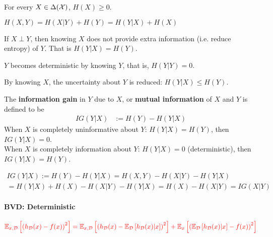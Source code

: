 \documentclass[4pt]{article}
\begin{document}
	\begin{proposition}
		For every $X \in \Delta(\mathcal{{X}})$, $H(X) \geq 0$.
	\end{proposition}
	\begin{proposition}
		$
			H(X, Y)=H(X | Y)+H(Y)=H(Y | X)+H(X)
		$
	\end{proposition}
	\begin{proposition}
		If $X \perp Y$, then knowing $X$ does not provide extra information (i.e. reduce entropy) of $Y$. That is $H(Y|X) = H(Y)$.
	\end{proposition}
	\begin{proposition}
		$Y$ becomes deterministic by knowing $Y$, that is, $H(Y|Y) = 0$.
	\end{proposition}
	\begin{proposition}
		By knowing $X$, the uncertainty about $Y$ is reduced: $H(Y|X) \leq H(Y)$.
	\end{proposition}
	\begin{definition}
		The \textbf{information gain} in $Y$ due to $X$, or \textbf{mutual information} of $X$ and $Y$ is defined to be
		\begin{align}
			IG(Y|X) &:= H(Y) - H(Y|X)
		\end{align}
		When $X$ is completely uninformative about $Y$: $H(Y|X) = H(Y)$, then $IG(Y|X) = 0$.\\
		When $X$ is completely information about $Y$: $H(Y|X) = 0$ (deterministic), then $IG(Y|X) = H(Y)$.
	\end{definition}
	\begin{proposition}
		\begin{align}
			IG(Y|X) := H(Y) - H(Y|X)
			= H(X, Y) - H(X|Y) - H(Y|X) \\
			= H(Y|X) + H(X) - H(X|Y) - H(Y|X)
			= H(X) - H(X|Y) 
			= IG(X|Y)
		\end{align}
	\end{proposition}
	\paragraph{BVD: Deterministic} 
	\begin{align}
		\textcolor{red}{\mathbb{E}_{x, \mathcal{D}}\left[\left(h_{\mathcal{D}}(x)-f(x)\right)^{2}\right]=\mathbb{E}_{x, \mathcal{D}}\left[\left(h_{\mathcal{D}}(x)-\mathbb{E}_{\mathcal{D}}\left[h_{\mathcal{D}}(x) | x\right]\right)^{2}\right]+\mathbb{E}_{x}\left[\left(\mathbb{E}_{\mathcal{D}}\left[h_{\mathcal{D}}(x) | x\right]-f(x)\right)^{2}\right]}
	\end{align}
\end{document}
